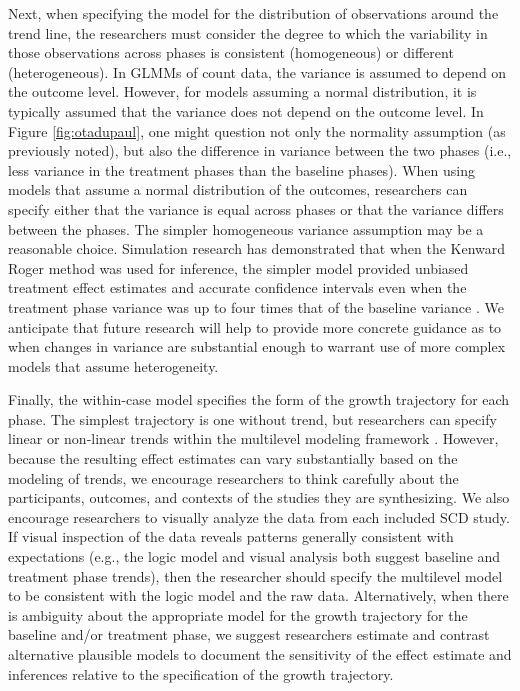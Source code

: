 \documentclass[
]{book}
\begin{document}
Next, when specifying the model for the distribution of observations around the trend line, the researchers must consider the degree to which the variability in those observations across phases is consistent (homogeneous) or different (heterogeneous).
In GLMMs of count data, the variance is assumed to depend on the outcome level.
However, for models assuming a normal distribution, it is typically assumed that the variance does not depend on the outcome level.
In Figure \ref{fig:otadupaul}, one might question not only the normality assumption (as previously noted), but also the difference in variance between the two phases (i.e., less variance in the treatment phases than the baseline phases).
When using models that assume a normal distribution of the outcomes, researchers can specify either that the variance is equal across phases or that the variance differs between the phases.
The simpler homogeneous variance assumption may be a reasonable choice.
Simulation research has demonstrated that when the Kenward Roger method was used for inference, the simpler model provided unbiased treatment effect estimates and accurate confidence intervals even when the treatment phase variance was up to four times that of the baseline variance \citep{Joo_et_al_2019}.
We anticipate that future research will help to provide more concrete guidance as to when changes in variance are substantial enough to warrant use of more complex models that assume heterogeneity.

Finally, the within-case model specifies the form of the growth trajectory for each phase.
The simplest trajectory is one without trend, but researchers can specify linear or non-linear trends within the multilevel modeling framework \citep[e.g.,][]{Hembry_Bunuan_Beretvas_Ferron_VandenNoortgate_2015, Rindskopf_2014, Swan_Pustejovsky_2018}.
However, because the resulting effect estimates can vary substantially based on the modeling of trends, we encourage researchers to think carefully about the participants, outcomes, and contexts of the studies they are synthesizing.
We also encourage researchers to visually analyze the data from each included SCD study. If visual inspection of the data reveals patterns generally consistent with expectations (e.g., the logic model and visual analysis both suggest baseline and treatment phase trends), then the researcher should specify the multilevel model to be consistent with the logic model and the raw data.
Alternatively, when there is ambiguity about the appropriate model for the growth trajectory for the baseline and/or treatment phase, we suggest researchers estimate and contrast alternative plausible models to document the sensitivity of the effect estimate and inferences relative to the specification of the growth trajectory.
\end{document}
